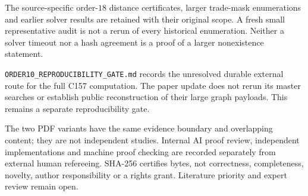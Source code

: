 The source-specific order-$18$ distance certificates, larger trade-mask
enumerations and earlier solver results are retained with their original
scope. A fresh small representative audit is not a rerun of every
historical enumeration. Neither a solver timeout nor a hash agreement
is a proof of a larger nonexistence statement.

\nolinkurl{ORDER10_REPRODUCIBILITY_GATE.md} records the unresolved durable
external route for the full C157 computation. The paper update does not
rerun its master searches or establish public reconstruction of their
large graph payloads. This remains a separate reproducibility gate.

The two PDF variants have the same evidence boundary and overlapping
content; they are not independent studies. Internal AI proof review,
independent implementations and machine proof checking are recorded
separately from external human refereeing. SHA-256 certifies bytes,
not correctness, completeness, novelty, author responsibility or a
rights grant. Literature priority and expert review remain open.
